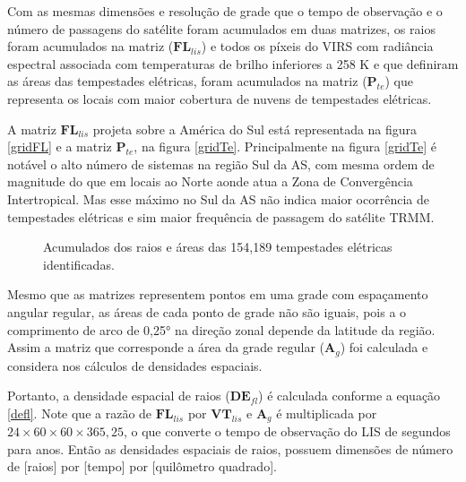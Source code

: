 
Com as mesmas dimensões e resolução de grade que o tempo de observação e o número de passagens do satélite foram acumulados em duas matrizes, os raios foram acumulados na matriz ($\mathbf{FL}_{lis}$) e todos os píxeis do VIRS com radiância espectral associada com temperaturas de brilho inferiores a 258 K e que definiram as áreas das tempestades elétricas, foram acumulados na matriz ($\mathbf{P}_{te}$) que representa os locais com maior cobertura de nuvens de tempestades elétricas.

A matriz $\mathbf{FL}_{lis}$ projeta sobre a América do Sul está representada na figura \ref{gridFL} e a matriz $\mathbf{P}_{te}$, na figura \ref{gridTe}. Principalmente na figura \ref{gridTe} é notável o alto número de sistemas na região Sul da AS, com mesma ordem de magnitude do que em locais ao Norte aonde atua a Zona de Convergência Intertropical. Mas esse máximo no Sul da AS não indica maior ocorrência de tempestades elétricas e sim maior frequência de passagem do satélite TRMM.

\begin{figure}[!ht]

\caption{Acumulados dos raios e áreas das 154,189 tempestades elétricas identificadas.}
\label{gridSistemas} 
\end{figure} 

Mesmo que as matrizes representem pontos em uma grade com espaçamento angular regular, as áreas de cada ponto de grade não são iguais, pois a  o comprimento de arco de 0,25° na direção zonal depende da latitude da região. Assim a matriz que corresponde a área da grade regular ($\mathbf{A}_g$) foi calculada e considera nos cálculos de densidades espaciais.


Portanto, a densidade espacial de raios ($\mathbf{DE}_{fl}$) é calculada conforme a equação \ref{defl}. Note que a razão de $\mathbf{FL}_{lis}$ por $\mathbf{VT}_{lis}$ e $\mathbf{A}_g$ é multiplicada por $24\times60\times60\times365,25$, o que converte o tempo de observação do LIS de segundos para anos. Então as densidades espaciais de raios, possuem dimensões de número de [raios] por [tempo] por [quilômetro quadrado].

